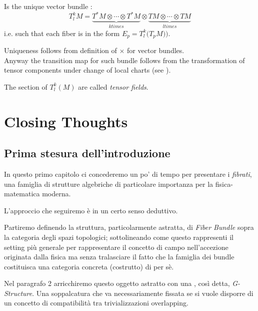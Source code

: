 \documentclass[a4paper,12pt]{scrartcl}    %
\begin{document}
\begin{definition}
Is the unique vector bundle :
	\begin{displaymath}
		T^k_l M = \underbrace{T^*M \otimes \cdots \otimes T^*M}_{k times} \otimes \underbrace{TM \otimes \cdots \otimes TM}_{l times} 
	\end{displaymath}
i.e. such that each fiber is in the form $E_p = T^k_l \big(T_p M) \big) $.	
\end{definition}

\begin{observation}
	Uniqueness follows from definition of $\times$ for vector bundles.
	\\
	Anyway the transition map for such bundle follows from the transformation of tensor components under change of local charts (see \cite{abate}).
\end{observation}

\begin{notationfix}
	The section of $T^k_l(M)$ are called \emph{tensor fields}.
\end{notationfix}


\newpage
\section{Closing Thoughts}
\subsection{Prima stesura dell'introduzione}
In questo primo capitolo ci concederemo un po' di tempo per presentare i \emph{fibrati}, una famiglia di strutture algebriche di particolare importanza per la fisica-matematica moderna.

L'approccio che seguiremo è in un certo senso deduttivo.

Partiremo definendo la struttura, particolarmente astratta, di \emph{Fiber Bundle} sopra la categoria degli spazi topologici; sottolineando come questo rappresenti il setting più generale per rappresentare il concetto di campo nell'accezione originata dalla fisica ma senza tralasciare il fatto che la famiglia dei bundle costituisca una categoria concreta (costrutto) di per sè.

Nel paragrafo 2 arricchiremo questo oggetto astratto con una , così detta, \emph{G-Structure}. Una soppalcatura che va necessariamente fissata se si vuole disporre di un concetto di compatibilità tra trivializzazioni overlapping.
\end{document}
